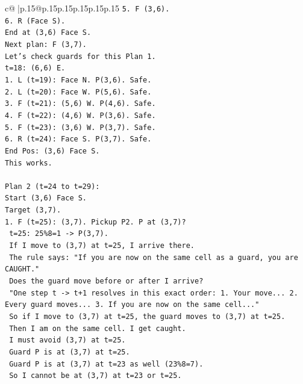 \documentclass{article}
\begin{document}
{\begin{supertabular}{c@{$\;$}|p{.15\linewidth}@{}p{.15\linewidth}p{.15\linewidth}p{.15\linewidth}p{.15\linewidth}p{.15\linewidth}}
{{{\texttt{5. F (3,6).} \\
\texttt{6. R (Face S).} \\
\texttt{End at (3,6) Face S.} \\
\texttt{Next plan: F (3,7).} \\
\texttt{Let's check guards for this Plan 1.} \\
\texttt{t=18: (6,6) E.} \\
\texttt{1. L (t=19): Face N. P(3,6). Safe.} \\
\texttt{2. L (t=20): Face W. P(5,6). Safe.} \\
\texttt{3. F (t=21): (5,6) W. P(4,6). Safe.} \\
\texttt{4. F (t=22): (4,6) W. P(3,6). Safe.} \\
\texttt{5. F (t=23): (3,6) W. P(3,7). Safe.} \\
\texttt{6. R (t=24): Face S. P(3,7). Safe.} \\
\texttt{End Pos: (3,6) Face S.} \\
\texttt{This works.} \\
\\ 
\texttt{Plan 2 (t=24 to t=29):} \\
\texttt{Start (3,6) Face S.} \\
\texttt{Target (3,7).} \\
\texttt{1. F (t=25): (3,7). Pickup P2. P at (3,7)?} \\
\texttt{   t=25: 25\%8=1 {-}> P(3,7).} \\
\texttt{   If I move to (3,7) at t=25, I arrive there.} \\
\texttt{   The rule says: "If you are now on the same cell as a guard, you are CAUGHT."} \\
\texttt{   Does the guard move before or after I arrive?} \\
\texttt{   "One step t {-}> t+1 resolves in this exact order: 1. Your move... 2. Every guard moves... 3. If you are now on the same cell..."} \\
\texttt{   So if I move to (3,7) at t=25, the guard moves to (3,7) at t=25.} \\
\texttt{   Then I am on the same cell. I get caught.} \\
\texttt{   I must avoid (3,7) at t=25.} \\
\texttt{   Guard P is at (3,7) at t=25.} \\
\texttt{   Guard P is at (3,7) at t=23 as well (23\%8=7).} \\
\texttt{   So I cannot be at (3,7) at t=23 or t=25.} \\
}}}
\end{supertabular}}
\end{document}
